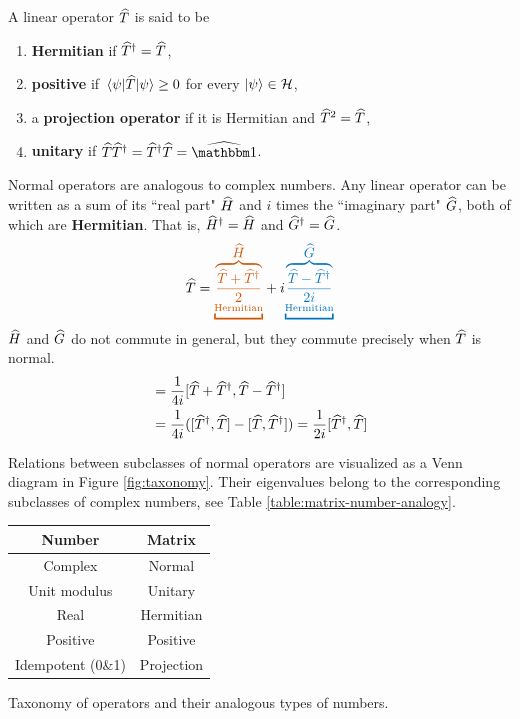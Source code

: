 \begin{definition}
	A linear operator $\widehat{T}$ is said to be 
	\begin{enumerate}
		\item {\bf Hermitian} if $\widehat{T}^{\dagger} = \widehat{T}$,
		\item {\bf positive} if $\expval{\widehat{T}}{\psi} \ge 0$ for every $\ket{\psi}\in \mathcal{H}$,
		\item a {\bf projection operator} if it is Hermitian and $\widehat{T}^2 = \widehat{T}$,
		\item {\bf unitary} if $\op T \op T\dgg = \op T\dgg \op T = \op\id$.
	\end{enumerate}
\end{definition}

Normal operators are analogous to complex numbers. Any linear operator can be written as a sum of its ``real part" $\widehat{H}$ and $i$ times the ``imaginary part" $\widehat{G}$, both of which are {\bf Hermitian}. That is, $\widehat{H}^{\dagger} = \widehat{H}$ and $\widehat{G}^{\dagger} = \widehat{G}$.
\begin{align}
	\op T = {\color{maincolor}\underbracket{\overbrace{\frac{\op T + \op T\dgg}{2}}_{\textrm{Hermitian}}}^{\displaystyle{\op H}}}
	+ i{\color{eqcolor}\underbracket{\overbrace{\frac{\op T - \op T\dgg}{2i}}_{\textrm{Hermitian}}}^{\displaystyle{\op G}}}
\end{align}
$\widehat{H}$ and $\widehat{G}$ do not commute in general, but they commute precisely when $\widehat{T}$ is normal.
\begin{align}
	[\op H, \op T] &= \frac{1}{4i} [\op T+\op T\dgg, \op T-\op T\dgg] \\
	&= \frac{1}{4i} ([\op T\dgg,\op T]-[\op T, \op T\dgg]) = \frac{1}{2i}[\op T\dgg,\op T]
\end{align}

Relations between subclasses of normal operators are visualized as a Venn diagram in Figure \ref{fig:taxonomy}. Their eigenvalues belong to the corresponding subclasses of complex numbers, see Table \ref{table:matrix-number-analogy}.
\begin{margintable}
	\begin{tabular}{ |c|c| } 
		\hline
		\scriptsize{Number} & \scriptsize{Matrix} \\
		\hline 
		\scriptsize{Complex} & \scriptsize{Normal} \\ 
		\scriptsize{Unit modulus} & \scriptsize{Unitary} \\
		\scriptsize{Real} & \scriptsize{Hermitian} \\
		\scriptsize{Positive} & \scriptsize{Positive} \\
		\scriptsize{Idempotent (0\&1)} & \scriptsize{Projection} \\
		\hline
	\end{tabular}
	\caption{Taxonomy of operators and their analogous types of numbers.}
	\label{table:matrix-number-analogy}
\end{margintable}

